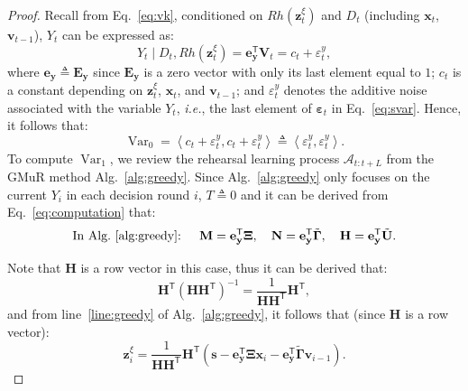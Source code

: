 \documentclass{article}
\theoremstyle{plain}
\theoremstyle{definition}
\theoremstyle{remark}
\def \ie {\textit{i.e.}}
\def \Eq {Eq.}
\def \x {\mathbf{x}}
\def \sA {\mathcal{A}}
\def \E {\mathbf{E}}
\def \V {\mathbf{V}}
\def \N {\mathbf{N}}
\def \s {\mathbf{s}}
\def \U {\mathbf{U}}
\def \M {\mathbf{M}}
\def \H {\mathbf{H}}
\def \V {\mathbf{V}}
\def \e {\mathbf{e}}
\def \v {\mathbf{v}}
\def \y {\mathbf{y}}
\def \z {\mathbf{z}}
\begin{document}
\begin{proof}
Recall from \Eq~\eqref{eq:vk}, conditioned on \(Rh(\z^\xi_t)\) and \(D_t\) (including \(\x_t\), \(\v_{t-1}\)), \(Y_t\) can be expressed as:
\[
Y_t \mid D_t, Rh(\z^\xi_t) = \e_\y^\mathsf{T}\V_t = c_t + \varepsilon^y_t, 
\]
where \(\e_\y\triangleq \E_\y\) since \(\E_\y\) is a zero vector with only its last element equal to \(1\); \(c_t\) is a constant depending on \(\z_t^\xi\), \(\x_t\), and \(\v_{t-1}\); and \(\varepsilon^y_t\) denotes the additive noise associated with the variable \(Y_t\), \ie, the last element of \(\bm{\varepsilon}_t\) in \Eq~\eqref{eq:svar}. 
Hence, it follows that:
\begin{equation}
  \label{eq:var0}
  \operatorname{Var}_0 = \left\langle c_t + \varepsilon^y_t, c_t + \varepsilon^y_t\right\rangle \triangleq \left\langle \varepsilon^y_t, \varepsilon^y_t\right\rangle.
\end{equation}
To compute \(\operatorname{Var}_1\), we review the rehearsal learning process \(\sA_{t:t+L}\) from the GMuR method Alg.~\ref{alg:greedy}. 
Since Alg.~\ref{alg:greedy} only focuses on the current \(Y_i\) in each decision round \(i\), \(T\triangleq 0\) and it can be derived from \Eq~\eqref{eq:computation} that:
\[
\text{In Alg.~\ref{alg:greedy}: }\quad \M = \e_\y^\mathsf{T} \bm{\Xi}, \quad \N = \e_\y^\mathsf{T} \tilde{\bm{\Gamma}}, \quad \H = \e_\y^\mathsf{T} \tilde{\bm{\U}}.
\]

Note that \(\H\) is a row vector in this case, thus it can be derived that:
\begin{equation*}
  \H^\mathsf{T}(\H\H^\mathsf{T})^{-1} = \frac{1}{\H\H^\mathsf{T}} \H^\mathsf{T},
\end{equation*}
and from line~\ref{line:greedy} of Alg.~\ref{alg:greedy}, it follows that (since \(\H\) is a row vector):
\begin{equation}
  \label{eq:dragger}
  \z_i^\xi=\frac{1}{\H\H^\mathsf{T}} \H^\mathsf{T} \left(\s - \e_\y^\mathsf{T} \bm{\Xi}\x_i-\e_\y^\mathsf{T} \tilde{\bm{\Gamma}}\v_{i-1}\right). 
\end{equation}


\end{proof}
\end{document}
